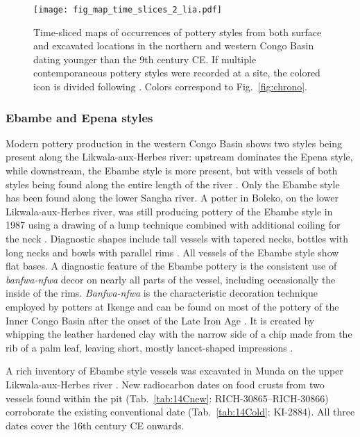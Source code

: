 \documentclass[smallextended,natbib]{svjour3}       %
\begin{document}
\begin{figure}[!tbp]
	\centering
	\texttt{[image: fig\_map\_time\_slices\_2\_lia.pdf]}
	\caption{Time-sliced maps of occurrences of pottery styles from both surface and excavated locations in the northern and western Congo Basin dating younger than the 9th century CE. If multiple contemporaneous pottery styles were recorded at a site, the colored icon is divided following \citet[218--244 Fig.~100--107]{Seidensticker.2021e}. Colors correspond to Fig.~\ref{fig:chrono}.}
	\label{fig:timeslices_2_lia}
\end{figure}

\subsubsection*{Ebambe and Epena styles}

Modern pottery production in the western Congo Basin shows two styles being present along the Likwala-aux-Herbes river: upstream dominates the Epena style, while downstream, the Ebambe style is more present, but with vessels of both styles being found along the entire length of the river \citep[131--141]{Seidensticker.2021e}. Only the Ebambe style has been found along the lower Sangha river. A potter in Boleko, on the lower Likwala-aux-Herbes river, was still producing pottery of the Ebambe style in 1987 using a drawing of a lump technique combined with additional coiling for the neck \citep{Eggert.inVorb.}. Diagnostic  shapes include tall vessels with tapered necks, bottles with long necks and bowls with parallel rims \citep[Fig.~\ref{fig:sangha}.13--14;][132 Fig.~57]{Seidensticker.2021e}. All vessels of the Ebambe style show flat bases. A diagnostic feature of the Ebambe pottery is the consistent use of \textit{banfwa-nfwa} decor on nearly all parts of the vessel, including occasionally the inside of the rims. \textit{Banfwa-nfwa} is the characteristic decoration technique employed by potters at Ikenge \citep[399]{Eggert.1980c} and can be found on most of the pottery of the Inner Congo Basin after the onset of the Late Iron Age \citep[109--111]{Wotzka.1995}. It is created by whipping the leather hardened clay with the narrow side of a chip made from the rib of a palm leaf, leaving short, mostly lancet-shaped impressions \citep[Fig.~\ref{fig:sangha}.13--14; \ref{fig:ubangi}.16,25;][386 Ftn.~5]{Eggert.1980b}.

A rich inventory of Ebambe style vessels was excavated in Munda on the upper Likwala-aux-Herbes river \citep[311--321]{Seidensticker.2021e}. New radiocarbon dates on food crusts from two vessels found within the pit (Tab.~\ref{tab:14Cnew}: RICH-30865--RICH-30866) corroborate the existing conventional date (Tab.~\ref{tab:14Cold}: KI-2884). All three dates cover the 16th century CE onwards.
\end{document}
